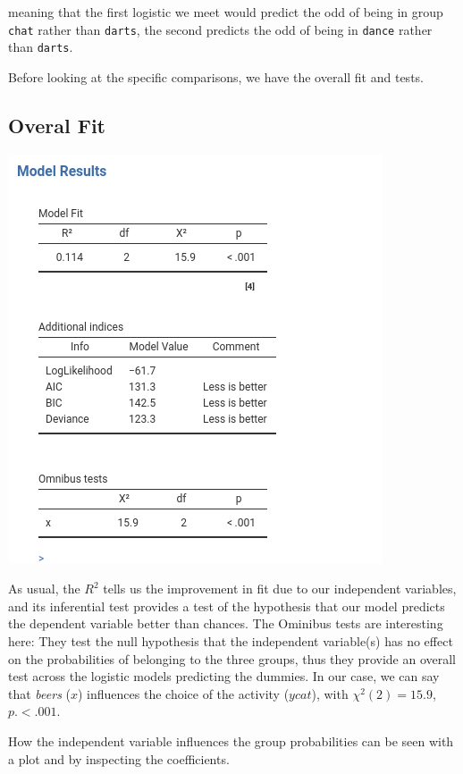 \documentclass[
]{book}
\begin{document}
meaning that the first logistic we meet would predict the odd of being in group \texttt{chat} rather than \texttt{darts}, the second predicts the odd of being in \texttt{dance} rather than \texttt{darts}.

Before looking at the specific comparisons, we have the overall fit and tests.

\hypertarget{overal-fit}{%
\subsection{Overal Fit}\label{overal-fit}}

\includegraphics{bookletpics/3_multi_output3.png}

As usual, the \(R^2\) tells us the improvement in fit due to our independent variables, and its inferential test provides a test of the hypothesis that our model predicts the dependent variable better than chances. The Ominibus tests are interesting here: They test the null hypothesis that the independent variable(s) has no effect on the probabilities of belonging to the three groups, thus they provide an overall test across the logistic models predicting the dummies. In our case, we can say that \emph{beers} (\(x\)) influences the choice of the activity (\(ycat\)), with \(\chi^2(2)=15.9\), \(p.<.001\).

How the independent variable influences the group probabilities can be seen with a plot and by inspecting the coefficients.
\end{document}
